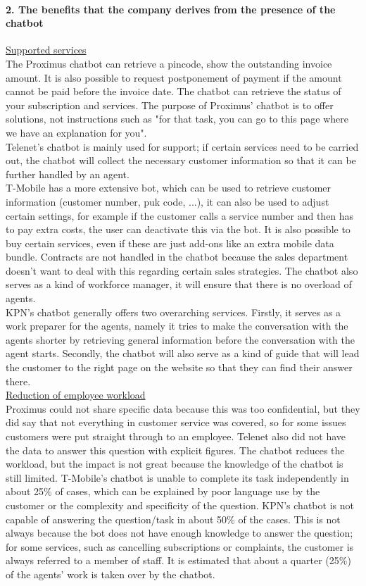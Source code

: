 \paragraph{2. The benefits that the company derives from the presence of the
	chatbot}
\ul{Supported services}\\
The Proximus chatbot can retrieve a pincode, show the outstanding invoice amount. It is also possible to request postponement of payment if the amount cannot be paid before the invoice date. The chatbot can retrieve the status of your subscription and services. The purpose of Proximus' chatbot is to offer solutions, not instructions such as "for that task, you can go to this page where we have an explanation for you".\\
\break
Telenet's chatbot is mainly used for support; if certain services need to be carried out, the chatbot will collect the necessary customer information so that it can be further handled by an agent.\\
\break
T-Mobile has a more extensive bot, which can be used to retrieve customer information (customer number, puk code, ...), it can also be used to adjust certain settings, for example if the customer calls a service number and then has to pay extra costs, the user can deactivate this via the bot. It is also possible to buy certain services, even if these are just add-ons like an extra mobile data bundle. Contracts are not handled in the chatbot because the sales department doesn't want to deal with this regarding certain sales strategies. The chatbot also serves as a kind of workforce manager, it will ensure that there is no overload of agents.\\
\break
KPN's chatbot generally offers two overarching services. Firstly, it serves as a work preparer for the agents, namely it tries to make the conversation with the agents shorter by retrieving general information before the conversation with the agent starts. Secondly, the chatbot will also serve as a kind of guide that will lead the customer to the right page on the website so that they can find their answer there.\\
\break
\ul{Reduction of employee workload}\\
Proximus could not share specific data because this was too confidential, but they did say that not everything in customer service was covered, so for some issues customers were put straight through to an employee. Telenet also did not have the data to answer this question with explicit figures. The chatbot reduces the workload, but the impact is not great because the knowledge of the chatbot is still limited. T-Mobile's chatbot is unable to complete its task independently in about 25\% of cases, which can be explained by poor language use by the customer or the complexity and specificity of the question. KPN's chatbot is not capable of answering the question/task in about 50\% of the cases. This is not always because the bot does not have enough knowledge to answer the question; for some services, such as cancelling subscriptions or complaints, the customer is always referred to a member of staff. It is estimated that about a quarter (25\%) of the agents' work is taken over by the chatbot.\\
